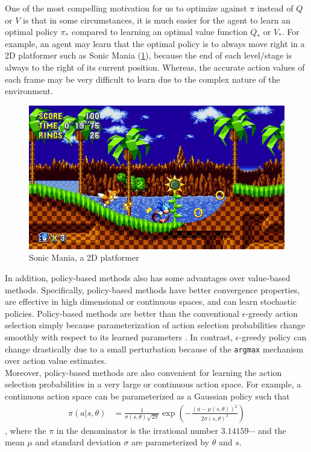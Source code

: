 \documentclass[12pt]{report}
\begin{document}
One of the most compelling motivation for us to optimize against $\pi$ instead of $Q$ or $V$ is that in some circumstances, it is much easier for the agent to learn an optimal policy $\pi_*$ compared to learning an optimal value function $Q_*$ or $V_*$. For example, an agent may learn that the optimal policy is to always move right in a 2D platformer such as Sonic Mania (\ref{fig:sonic}), because the end of each level/stage is always to the right of its current position. Whereas, the accurate action values of each frame may be very difficult to learn due to the complex nature of the environment.
\begin{figure}[H]
    \center
    \includegraphics[width=0.3\linewidth]{figs/sonic_mania.jpg}
    \caption{Sonic Mania, a 2D platformer}
    \label{fig:sonic}
\end{figure}
In addition, policy-based methods also has some advantages over value-based methods. Specifically, policy-based methods have better convergence properties\cite{sutton2018reinforcement}, are effective in high dimensional or continuous spaces, and can learn stochastic policies. Policy-based methods are better than the conventional $\epsilon$-greedy action selection simply because parameterization of action selection probabilities change smoothly with respect to its learned parameters \cite{sutton2018reinforcement}. In contrast, $\epsilon$-greedy policy can change drastically due to a small perturbation because of the \texttt{argmax} mechanism over action value estimates.\\

Moreover, policy-based methods are also convenient for learning the action selection probabilities in a very large or continuous action space. For example, a continuous action space can be parameterized as a Gaussian policy such that
\begin{align}
    \pi(a|s,\theta) &= \frac{1}{\sigma(s,\theta)\sqrt{2\pi}}\exp \left(-\frac{(a-\mu(s,\theta))^2}{2\sigma(s,\theta)^2}\right)
\end{align}
, where the $\pi$ in the denominator is the irrational number $3.14159\cdots$ and the mean $\mu$ and standard deviation $\sigma$ are parameterized by $\theta$ and $s$.\\
\end{document}
